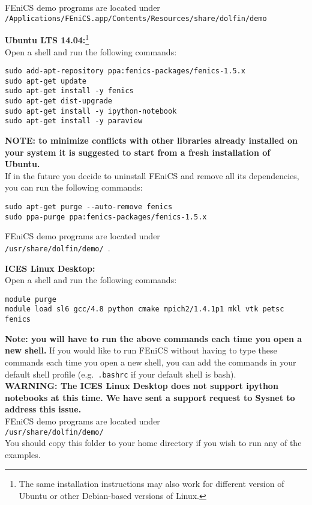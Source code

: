 \documentclass[11pt]{article}
\begin{document}
FEniCS demo programs are located under \\
{\tt /Applications/FEniCS.app/Contents/Resources/share/dolfin/demo }

\item {\bf Ubuntu LTS 14.04:}\footnote{The same installation
  instructions may also work for different version of Ubuntu or other
  Debian-based versions of Linux.}\\ 
Open a shell and run the following commands:
\begin{verbatim}
sudo add-apt-repository ppa:fenics-packages/fenics-1.5.x
sudo apt-get update 
sudo apt-get install -y fenics
sudo apt-get dist-upgrade
sudo apt-get install -y ipython-notebook
sudo apt-get install -y paraview
\end{verbatim}
{\bf NOTE: to minimize conflicts with other libraries already installed on your system it is suggested to start from a fresh installation of Ubuntu.}\\
If in the future you decide to uninstall FEniCS and remove all its
dependencies, you can run the following commands:
\begin{verbatim}
sudo apt-get purge --auto-remove fenics
sudo ppa-purge ppa:fenics-packages/fenics-1.5.x
\end{verbatim}

FEniCS demo programs are located under \\
{\tt /usr/share/dolfin/demo/ }.\\

\item {\bf ICES Linux Desktop:}\\
Open a shell and run the following commands:
\begin{verbatim}
module purge
module load sl6 gcc/4.8 python cmake mpich2/1.4.1p1 mkl vtk petsc fenics
\end{verbatim}
{\bf Note: you will have to run the above commands each time you open
  a new shell.} If you would like to run FEniCS without having to type
these commands each time you open a new shell, you can add the
commands in your default shell profile (e.g.\ {\tt .bashrc} if your
default shell is bash).\\ 
{\bf WARNING: The ICES Linux Desktop does not support ipython notebooks at this time. We have sent a support request to Sysnet to address this issue.}\\
FEniCS demo programs are located under \\
{\tt /usr/share/dolfin/demo/ }\\
You should copy this folder to your home directory if you wish to run any of the examples.\\
\end{document}
